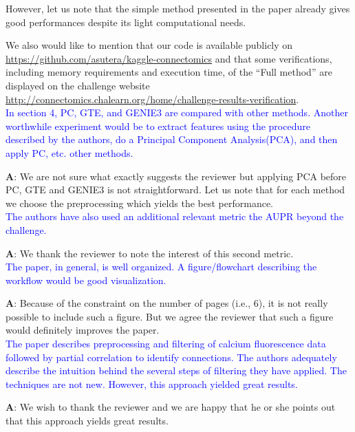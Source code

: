 \documentclass[wcp]{jmlr}
\begin{document}
However, let us note that the simple method presented in the paper already gives good performances despite its light computational needs.

We also would like to mention that our code is available publicly on \url{https://github.com/asutera/kaggle-connectomics} and that some verifications, including memory requirements and execution time, of the ``Full method'' are displayed on the challenge website \url{http://connectomics.chalearn.org/home/challenge-results-verification}.\\

\noindent
\textcolor{blue}{In section 4, PC, GTE, and GENIE3 are compared with other methods. Another worthwhile experiment would be to extract features using the procedure described by the authors, do a Principal Component Analysis(PCA), and then apply PC, etc. other methods.}

\textbf{A}: We are not sure what exactly suggests the reviewer but applying PCA before PC, GTE and GENIE3 is not straightforward. Let us note that for each method we choose the preprocessing which yields the best performance.\\

\noindent
\textcolor{blue}{The authors have also used an additional relevant metric the AUPR beyond the challenge.}

\textbf{A}: We thank the reviewer to note the interest of this second metric.\\

\noindent
\textcolor{blue}{The paper, in general, is well organized. A figure/flowchart describing the workflow would be good visualization.}

\textbf{A}: Because of the constraint on the number of pages (i.e., $6$), it is not really possible to include such a figure. But we agree the reviewer that such a figure would definitely improves the paper.\\


\noindent
\textcolor{blue}{The paper describes preprocessing and filtering of calcium fluorescence data followed by partial correlation to identify connections.  The authors adequately describe the intuition behind the several steps of filtering they have applied.  The techniques are not new. However, this approach yielded great results.}

\textbf{A}: We wish to thank the reviewer and we are happy that he or she points out that this approach yields great results.\\
\end{document}
